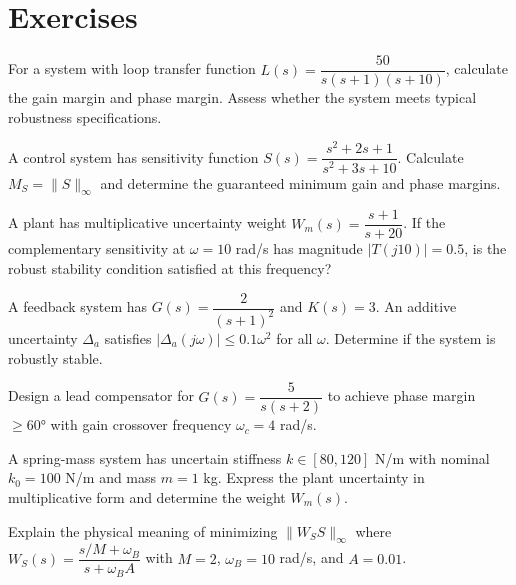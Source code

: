 \newpage
\section{Exercises}
\label{sec:problems}

\begin{exercise}
For a system with loop transfer function $L(s) = \dfrac{50}{s(s+1)(s+10)}$, calculate the gain margin and phase margin. Assess whether the system meets typical robustness specifications.
\end{exercise}

\begin{exercise}
A control system has sensitivity function $S(s) = \dfrac{s^2 + 2s + 1}{s^2 + 3s + 10}$. Calculate $M_S = \|S\|_\infty$ and determine the guaranteed minimum gain and phase margins.
\end{exercise}

\begin{exercise}
A plant has multiplicative uncertainty weight $W_m(s) = \dfrac{s+1}{s+20}$. If the complementary sensitivity at $\omega = 10$ rad/s has magnitude $|T(j10)| = 0.5$, is the robust stability condition satisfied at this frequency?
\end{exercise}

\begin{exercise}
A feedback system has $G(s) = \dfrac{2}{(s+1)^2}$ and $K(s) = 3$. An additive uncertainty $\Delta_a$ satisfies $|\Delta_a(j\omega)| \leq 0.1\omega^2$ for all $\omega$. Determine if the system is robustly stable.
\end{exercise}

\begin{exercise}
Design a lead compensator for $G(s) = \dfrac{5}{s(s+2)}$ to achieve phase margin $\geq 60°$ with gain crossover frequency $\omega_c = 4$ rad/s.
\end{exercise}

\begin{exercise}
A spring-mass system has uncertain stiffness $k \in [80, 120]$ N/m with nominal $k_0 = 100$ N/m and mass $m = 1$ kg. Express the plant uncertainty in multiplicative form and determine the weight $W_m(s)$.
\end{exercise}

\begin{exercise}
Explain the physical meaning of minimizing $\|W_S S\|_\infty$ where $W_S(s) = \dfrac{s/M + \omega_B}{s + \omega_B A}$ with $M = 2$, $\omega_B = 10$ rad/s, and $A = 0.01$.
\end{exercise}

